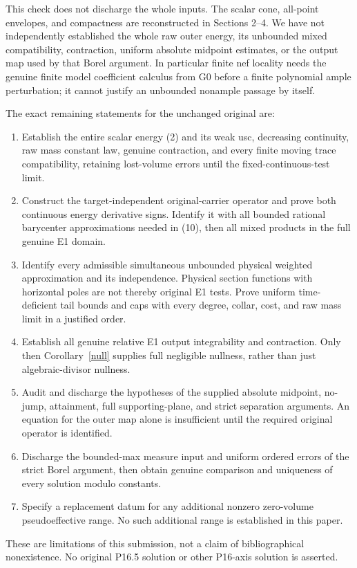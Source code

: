 \documentclass[10pt]{article}
\begin{document}
This check does not discharge the whole inputs. The scalar cone,
all-point envelopes, and compactness are reconstructed in Sections
2--4. We have not independently established the whole raw outer
energy, its unbounded mixed compatibility, contraction, uniform
absolute midpoint estimates, or the output map used by that Borel
argument. In particular finite nef locality needs the genuine finite
model coefficient calculus from G0 before a finite polynomial ample
perturbation; it cannot justify an unbounded nonample passage by itself.

The exact remaining statements for the unchanged original are:
\begin{enumerate}
\item Establish the entire scalar energy (2) and its weak usc,
decreasing continuity, raw mass constant law, genuine contraction,
and every finite moving trace compatibility, retaining lost-volume
errors until the fixed-continuous-test limit.
\item Construct the target-independent original-carrier operator
and prove both continuous energy derivative signs. Identify it
with all bounded rational barycenter approximations needed in (10),
then all mixed products in the full genuine E1 domain.
\item Identify every admissible simultaneous unbounded physical
weighted approximation and its independence. Physical section
functions with horizontal poles are not thereby original E1 tests.
Prove uniform time-deficient tail bounds and caps with every degree,
collar, cost, and raw mass limit in a justified order.
\item Establish all genuine relative E1 output integrability and
contraction. Only then Corollary~\ref{null} supplies full negligible
nullness, rather than just algebraic-divisor nullness.
\item Audit and discharge the hypotheses of the supplied absolute
midpoint, no-jump, attainment, full supporting-plane, and strict
separation arguments. An equation for the outer map alone is
insufficient until the required original operator is identified.
\item Discharge the bounded-max measure input and uniform ordered
errors of the strict Borel argument, then obtain genuine comparison
and uniqueness of every solution modulo constants.
\item Specify a replacement datum for any additional nonzero
zero-volume pseudoeffective range. No such additional range is
established in this paper.
\end{enumerate}
These are limitations of this submission, not a claim of
bibliographical nonexistence. No original P16.5 solution or other
P16-axis solution is asserted.
\end{document}
